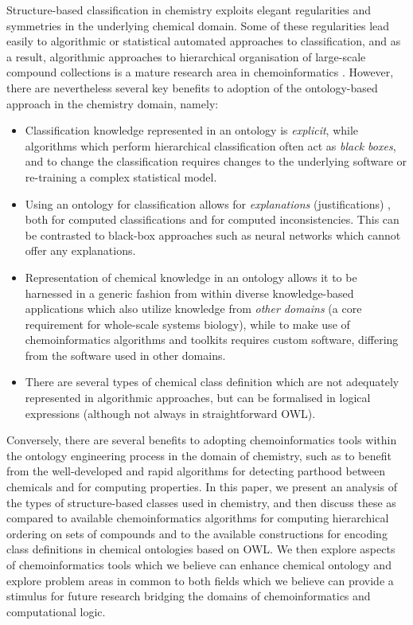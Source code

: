 \documentclass[10pt]{bmc_article}
\newenvironment{bmcformat}{\baselineskip20pt\sloppy\setboolean{publ}{false}}{\baselineskip20pt\sloppy}
\begin{document}
\begin{bmcformat}
Structure-based classification in chemistry exploits elegant regularities and symmetries in the underlying chemical domain.  Some of these regularities lead easily to algorithmic or statistical automated approaches to classification, and as a result, algorithmic approaches to hierarchical organisation of large-scale compound collections is a mature research area in chemoinformatics \cite{barnard1992,deshpande2005}. However, there are nevertheless several key benefits to adoption of the ontology-based approach in the chemistry domain, namely:
\begin{itemize}
	\item Classification knowledge represented in an ontology is \textit{explicit}, while algorithms which perform hierarchical classification often act as \textit{black boxes}, and to change the classification requires changes to the underlying software or re-training a complex statistical model.
	\item Using an ontology for classification allows for \textit{explanations} (justifications) \cite{horridgeentail09}, both for computed classifications and for computed inconsistencies. This can be contrasted to black-box approaches such as neural networks which cannot offer any explanations. 
	\item Representation of chemical knowledge in an ontology allows it to be harnessed in a generic fashion from within diverse knowledge-based applications which also utilize knowledge from \textit{other domains} (a core requirement for whole-scale systems biology), while to make use of chemoinformatics algorithms and toolkits requires custom software, differing from the software used in other domains.
	\item There are several types of chemical class definition which are not adequately represented in algorithmic approaches, but can be formalised in logical expressions (although not always in straightforward OWL). 
\end{itemize}

Conversely, there are several benefits to adopting chemoinformatics tools within the ontology engineering process in the domain of chemistry, such as to benefit from the well-developed and rapid algorithms for detecting parthood between chemicals and for computing properties.  In this paper, we present an analysis of the types of structure-based classes used in chemistry, and then discuss these as compared to available chemoinformatics algorithms for computing hierarchical ordering on sets of compounds and to the available constructions for encoding class definitions in chemical ontologies based on OWL.  We then explore aspects of chemoinformatics tools which we believe can enhance chemical ontology and explore problem areas in common to both fields which we believe can provide a stimulus for future research bridging the domains of chemoinformatics and computational logic. 


\end{bmcformat}
\end{document}
